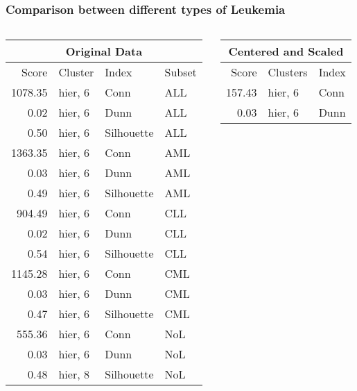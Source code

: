 \documentclass[10pt,dvipsnames,table, handout]{beamer} %
\begin{document}
\begin{frame}
\frametitle{Comparison between different types of Leukemia}
\begin{columns}
\begin{column}{.5\textwidth}
\begin{table}[ht]
\centering
{\footnotesize
{}
\begin{tabular}{rlll}
\hline
\multicolumn{4}{c}{Original Data} \\
  \hline
 Score & Cluster & Index & Subset \\ 
  \hline
  1078.35 & hier, 6 & Conn & ALL \\ 
  0.02 & hier, 6 & Dunn & ALL \\ 
  0.50 & hier, 6 & Silhouette & ALL \\ 
  1363.35 & hier, 6 & Conn & AML \\ 
  0.03 & hier, 6 & Dunn & AML \\ 
  0.49 & hier, 6 & Silhouette & AML \\ 
  904.49 & hier, 6 & Conn & CLL \\ 
  0.02 & hier, 6 & Dunn & CLL \\ 
  0.54 & hier, 6 & Silhouette & CLL \\ 
  1145.28 & hier, 6 & Conn & CML \\ 
  0.03 & hier, 6 & Dunn & CML \\ 
  0.47 & hier, 6 & Silhouette & CML \\ 
  555.36 & hier, 6 & Conn & NoL \\ 
  0.03 & hier, 6 & Dunn & NoL \\ 
  0.48 & hier, 8 & Silhouette & NoL \\ 
   \hline
\end{tabular}
}
\end{table}
\end{column}
\begin{column}{.5\textwidth}
\begin{table}[ht]
\centering
{\footnotesize
{}
\begin{tabular}{rll}
\hline
\multicolumn{3}{c}{Centered and Scaled} \\
\hline
Score & Clusters & Index \\ 
  \hline
157.43 & hier, 6 & Conn \\ 
  0.03 & hier, 6 & Dunn \\ 

\end{tabular}}
\end{table}
\end{column}
\end{columns}
\end{frame}
\end{document}
